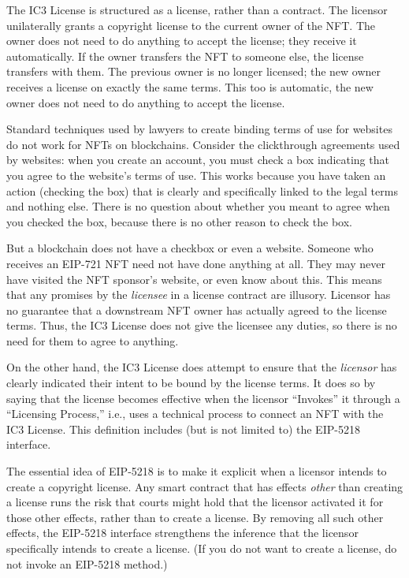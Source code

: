 \documentclass{article}
\newcommand{\eiplicense}{EIP-5218\xspace}
\begin{document}
The IC3 License is structured as a license, rather than a contract. The licensor unilaterally grants a copyright license to the current owner of the NFT. The owner does not need to do anything to accept the license; they receive it automatically. If the owner transfers the NFT to someone else, the license transfers with them. The previous owner is no longer licensed; the new owner receives a license on exactly the same terms. This too is automatic, the new owner does not need to do anything to accept the license.

Standard techniques used by lawyers to create binding terms of use for websites do not work for NFTs on blockchains. Consider the clickthrough agreements used by websites: when you create an account, you must check a box indicating that you agree to the website's terms of use. This works because you have taken an action (checking the box) that is clearly and specifically linked to the legal terms and nothing else. There is no question about whether you meant to agree when you checked the box, because there is no other reason to check the box. 

But a blockchain does not have a checkbox or even a website. Someone who receives an EIP-721 NFT need not have done anything at all. They may never have visited the NFT sponsor's website, or even know about this. This means that any promises by the \emph{licensee} in a license contract are  illusory. Licensor has no guarantee that a downstream NFT owner has actually agreed to the license terms. Thus, the IC3 License does not give the licensee any duties, so there is no need for them to agree to anything.

On the other hand, the IC3 License does attempt to ensure that the \emph{licensor} has clearly indicated their intent to be bound by the license terms. It does so by saying that the license becomes effective when the licensor ``Invokes'' it through a ``Licensing Process,'' i.e., uses a technical process to connect an NFT with the IC3 License. This definition includes (but is not limited to) the \eiplicense interface. 

The essential idea of \eiplicense  is to make it explicit when a licensor intends to create a copyright license. Any smart contract that has effects \emph{other} than creating a license runs the risk that courts might hold that the licensor activated it for those other effects, rather than to create a license. By removing all such other effects, the \eiplicense interface strengthens the inference that the licensor specifically intends to create a license. (If you do not want to create a license, do not invoke an \eiplicense method.)
\end{document}

